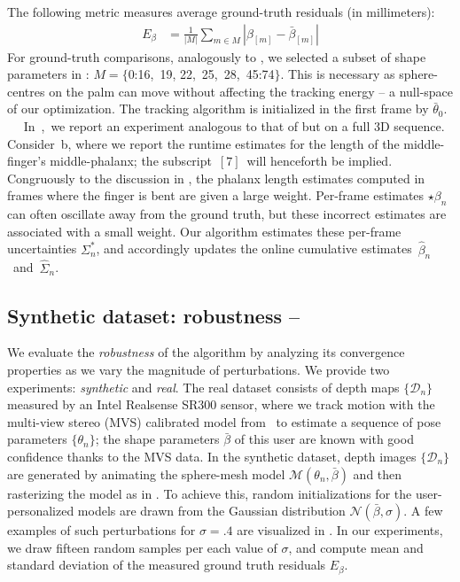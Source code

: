 The following metric measures average ground-truth residuals (in millimeters):
% 
\begin{align}
E_{\beta} &= \tfrac{1}{|M|} \sum_{m \in M} \left| \beta_{[m]} - \bar\beta_{[m]} \right|
\label{eq:metricgt}
\end{align}
% 
For ground-truth comparisons, analogously to \cite{taylor2016joint}, we selected a subset of shape parameters in : $M=\{$0:16,~19, 22,~25,~28,~45:74$\}$. This is necessary as sphere-centres on the palm can move without affecting the tracking energy -- a null-space of our optimization. The tracking algorithm is initialized in the first frame by $\bar\theta_0$.
%
$\quad$
% 
In~,~we report an experiment analogous to that of  but on a full 3D sequence.
Consider~b, where we report the runtime estimates for the length of the middle-finger's middle-phalanx; the subscript~{$[7]$}~will henceforth be implied.
Congruously to the discussion in , the phalanx length
estimates computed in frames where the finger is bent are given a large weight.
Per-frame estimates {\small $\star\beta_n$} can often oscillate away from the ground truth, but these incorrect estimates are associated with a small weight.
% 
Our algorithm estimates these per-frame uncertainties {\small $\Sigma^*_n$}, and accordingly updates the online cumulative estimates~{\small $\hat\beta_n$}~and~{\small $\hat\Sigma_n$}.


\subsection{Synthetic dataset: robustness -- }
\label{sec:evalsynth}
We evaluate the \emph{robustness} of the algorithm by analyzing its convergence properties as we vary the magnitude of perturbations.
We provide two experiments: \emph{synthetic} and \emph{real}. The real dataset consists of depth maps $\{\mathcal{D}_n\}$ measured by an Intel Realsense SR300 sensor, where we track motion with the multi-view stereo (MVS) calibrated model from~\cite{tkach2016sphere} to estimate a sequence of pose parameters $\{ \theta_n \}$; the shape parameters $\bar\beta$ of this user are known with good confidence thanks to the MVS data. In the synthetic dataset, depth images $\{\mathcal{D}_n\}$ are generated by animating the sphere-mesh model $\mathcal{M}(\theta_n, \bar\beta)$ and then rasterizing the model as in .
To achieve this, random initializations for the user-personalized models are drawn from the Gaussian distribution {\small $\mathcal{N}(\bar\beta, \sigma)$}. A few examples of such perturbations for $\sigma=.4$ are visualized in .
In our experiments, we draw fifteen random samples per each value of $\sigma$, and compute mean and standard deviation of the measured ground truth residuals $E_\beta$. 

